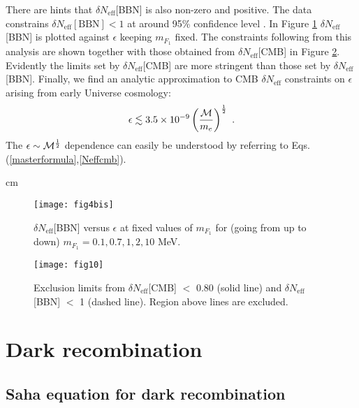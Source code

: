 \documentclass[12pt]{article}
\begin{document}
There are hints that $\delta N _{\text{eff}}$[BBN] is also non-zero and
positive. The data constrains $\delta N _{\text{eff}}[\text{BBN}] < 1$
at around 95\% confidence level \cite{izotov}. In Figure
\ref{fig:Neffbbnmf1} $\delta N _{\text{eff}}$[BBN] is plotted against
$\epsilon$ keeping $m _{F_1}$ fixed. The constraints following from this
analysis are shown together with those obtained from $\delta N
_{\text{eff}}$[CMB] in Figure \ref{fig:Comparison bbn cmb}. Evidently
the limits set by $\delta N _{\text{eff}}$[CMB] are more stringent than
those set by $\delta N _{\text{eff}}$[BBN]. Finally, we find an analytic
approximation to CMB $\delta N _{\text{eff}}$ constraints on $\epsilon$
arising from early Universe cosmology:
%
\begin{eqnarray}
\epsilon \lesssim 3.5 \times 10 ^{-9} \left ( \frac{{\cal M}}{m _e}
\right ) ^{\frac{1}{2}} \ .
\label{constraints}
\end{eqnarray}
%
The $\epsilon \sim {\cal M}^{\frac{1}{2}}$ dependence can easily be
understood by referring to Eqs.(\ref{masterformula},\ref{Neffcmb}).

 cm
%
\begin{figure}[htpb]
    \centering
        \texttt{[image: fig4bis]}
    \caption{$\delta N _{\text{eff}}$[BBN] versus $\epsilon$ at fixed
values of $m_{F_1}$ for (going from up to down) $m _{F_1} = 0.1, 0.7, 1,
2, 10$ MeV.}
    \label{fig:Neffbbnmf1}
\end{figure}
%
\begin{figure}[htpb]
    \centering
        \texttt{[image: fig10]}
    \caption{Exclusion limits from $\delta N _{\text{eff}}$[CMB] $<$
0.80 (solid line) and $\delta N _{\text{eff}}$[BBN] $<$ 1 (dashed line).
Region above lines are excluded.}
    \label{fig:Comparison bbn cmb}
\end{figure}
%

\newpage

\section{Dark recombination}

\subsection{Saha equation for dark recombination}
\end{document}
